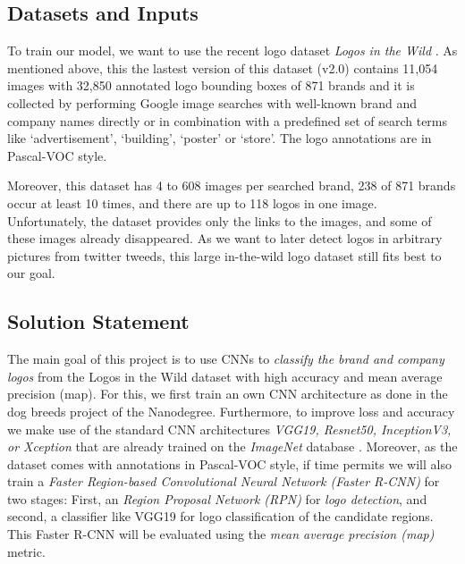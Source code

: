\documentclass{scrartcl}
\begin{document}
\subsection*{Datasets and Inputs}

To train our model, we want to use the recent logo dataset \emph{Logos in the Wild} \cite{logosinthewild}. As mentioned above, this the lastest version of this dataset (v2.0) contains 11,054 images with 32,850 annotated logo bounding boxes of 871 brands and it is collected by performing Google image searches with well-known brand and company names directly or in combination with a predefined set of search terms like ‘advertisement’, ‘building’, ‘poster’ or ‘store’.
The logo annotations are in Pascal-VOC style.

Moreover, this dataset has 4 to 608 images per searched brand, 
238 of 871 brands occur at least 10 times, and there are up to 118 logos in one image. Unfortunately, the dataset provides only the links to the images, and some of these images already disappeared.
As we want to later detect logos in arbitrary pictures from twitter tweeds, this large in-the-wild logo dataset still fits best to our goal. 

\subsection*{Solution Statement}

The main goal of this project is to use CNNs to \emph{classify the brand and company logos} from the Logos in the Wild dataset with high accuracy and mean average precision (map).
For this, we first train an own CNN architecture as done in the dog breeds project of the Nanodegree.
Furthermore, to improve loss and accuracy we make use of the standard CNN architectures \emph{VGG19, Resnet50, InceptionV3, or Xception} that are already trained on the \emph{ImageNet} database \cite{kerasapplications}.
Moreover, as the dataset comes with annotations in Pascal-VOC style, if time permits we will also train a \emph{Faster Region-based Convolutional Neural Network (Faster R-CNN)} \cite{DBLP:journals/corr/RenHG015} for two stages: First, an \emph{Region Proposal Network (RPN)} for \emph{logo detection}, and second, a classifier like VGG19 for logo classification of the candidate regions.
 This Faster R-CNN will be evaluated using the \emph{mean average precision (map)} metric.
\end{document}
